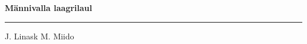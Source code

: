 \documentclass[10pt]{book}
\begin{document}
{
  \samepage
  \raggedbottom
  \raggedright
  \sloppy


  \vspace{0.2in}

  \noindent\begin{minipage}{.1\textwidth}
    \hfill\vspace{0.1in}
  \end{minipage}%
  \noindent\begin{minipage}{.8\textwidth}
    \centering
    \bfseries
    \large M\"annivalla laagrilaul
  \end{minipage}%
  \noindent\begin{minipage}{.1\textwidth}
      \hfill\vspace{0.1in}
  \end{minipage}

  \nopagebreak[4]
  \vspace{0.1in}
  \nopagebreak[4]
  \hrule height 0.05ex
  \nopagebreak[4]
  \vspace{-0.05in}

  {\footnotesize J. Linask \hfill M. Miido }\\
  \vspace{0.01in}



}
\end{document}
